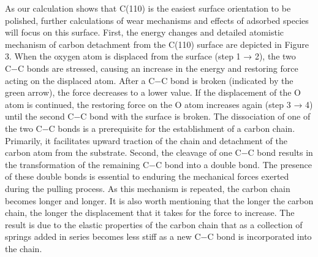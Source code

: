\documentclass{article}
\begin{document}
As our calculation shows that C(110) is the easiest surface orientation to be polished, further calculations of wear mechanisms and effects of adsorbed species will focus on this surface. First, the energy changes and detailed atomistic mechanism of carbon detachment from the C(110) surface are depicted in Figure 3. When the oxygen atom is displaced from the surface (step 1 → 2), the two C−C bonds are stressed, causing an increase in the energy and restoring force acting on the displaced atom. After a C−C bond is broken (indicated by the green arrow), the force decreases to a lower value. If the displacement of the O atom is continued, the restoring force on the O atom increases again (step 3 → 4) until the second C−C bond with the surface is broken. The dissociation of one of the two C−C bonds is a prerequisite for the establishment of a carbon chain. Primarily, it facilitates upward traction of the chain and detachment of the carbon atom from the substrate. Second, the cleavage of one C−C bond results in the transformation of the remaining C−C bond into a double bond. The presence of these double bonds is essential to enduring the mechanical forces exerted during the pulling process. As this mechanism is repeated, the carbon chain becomes longer and longer. It is also worth mentioning that the longer the carbon chain, the longer the displacement that it takes for the force to increase. The result is due to the elastic properties of the carbon chain that as a collection of springs added in series becomes less stiff as a new C−C bond is incorporated into the chain.
\end{document}
